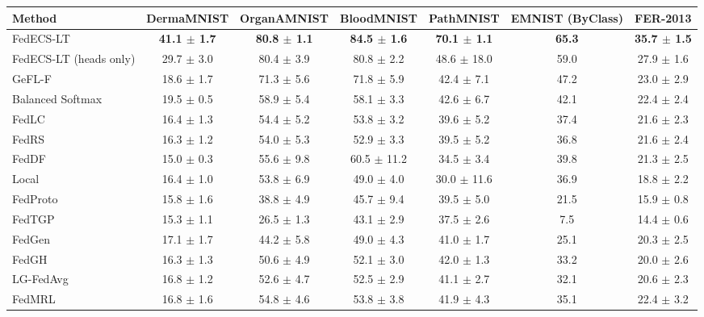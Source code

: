 \begin{tabular}{lcccccc}
\toprule
Method & DermaMNIST & OrganAMNIST & BloodMNIST & PathMNIST & EMNIST (ByClass) & FER-2013\\
\midrule
FedECS-LT & \textbf{41.1 $\pm$ 1.7} & \textbf{80.8 $\pm$ 1.1} & \textbf{84.5 $\pm$ 1.6} & \textbf{70.1 $\pm$ 1.1} & \textbf{65.3} & \textbf{35.7 $\pm$ 1.5}\\
FedECS-LT (heads only) & 29.7 $\pm$ 3.0 & 80.4 $\pm$ 3.9 & 80.8 $\pm$ 2.2 & 48.6 $\pm$ 18.0 & 59.0 & 27.9 $\pm$ 1.6\\
GeFL-F & 18.6 $\pm$ 1.7 & 71.3 $\pm$ 5.6 & 71.8 $\pm$ 5.9 & 42.4 $\pm$ 7.1 & 47.2 & 23.0 $\pm$ 2.9\\
Balanced Softmax & 19.5 $\pm$ 0.5 & 58.9 $\pm$ 5.4 & 58.1 $\pm$ 3.3 & 42.6 $\pm$ 6.7 & 42.1 & 22.4 $\pm$ 2.4\\
FedLC & 16.4 $\pm$ 1.3 & 54.4 $\pm$ 5.2 & 53.8 $\pm$ 3.2 & 39.6 $\pm$ 5.2 & 37.4 & 21.6 $\pm$ 2.3\\
FedRS & 16.3 $\pm$ 1.2 & 54.0 $\pm$ 5.3 & 52.9 $\pm$ 3.3 & 39.5 $\pm$ 5.2 & 36.8 & 21.6 $\pm$ 2.4\\
FedDF & 15.0 $\pm$ 0.3 & 55.6 $\pm$ 9.8 & 60.5 $\pm$ 11.2 & 34.5 $\pm$ 3.4 & 39.8 & 21.3 $\pm$ 2.5\\
Local & 16.4 $\pm$ 1.0 & 53.8 $\pm$ 6.9 & 49.0 $\pm$ 4.0 & 30.0 $\pm$ 11.6 & 36.9 & 18.8 $\pm$ 2.2\\
FedProto & 15.8 $\pm$ 1.6 & 38.8 $\pm$ 4.9 & 45.7 $\pm$ 9.4 & 39.5 $\pm$ 5.0 & 21.5 & 15.9 $\pm$ 0.8\\
FedTGP & 15.3 $\pm$ 1.1 & 26.5 $\pm$ 1.3 & 43.1 $\pm$ 2.9 & 37.5 $\pm$ 2.6 & 7.5 & 14.4 $\pm$ 0.6\\
FedGen & 17.1 $\pm$ 1.7 & 44.2 $\pm$ 5.8 & 49.0 $\pm$ 4.3 & 41.0 $\pm$ 1.7 & 25.1 & 20.3 $\pm$ 2.5\\
FedGH & 16.3 $\pm$ 1.3 & 50.6 $\pm$ 4.9 & 52.1 $\pm$ 3.0 & 42.0 $\pm$ 1.3 & 33.2 & 20.0 $\pm$ 2.6\\
LG-FedAvg & 16.8 $\pm$ 1.2 & 52.6 $\pm$ 4.7 & 52.5 $\pm$ 2.9 & 41.1 $\pm$ 2.7 & 32.1 & 20.6 $\pm$ 2.3\\
FedMRL & 16.8 $\pm$ 1.6 & 54.8 $\pm$ 4.6 & 53.8 $\pm$ 3.8 & 41.9 $\pm$ 4.3 & 35.1 & 22.4 $\pm$ 3.2\\
\bottomrule
\end{tabular}
